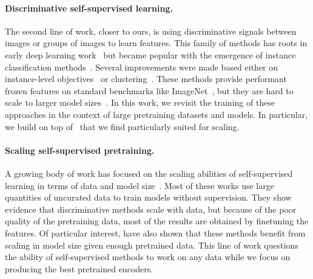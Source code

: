 \paragraph{Discriminative self-supervised learning.}
The second line of work, closer to ours, is using discriminative signals between images or groups of images to learn features.
This family of methods has roots in early deep learning work~\citep{hadsell2006dimensionality} but became popular with the emergence of instance classification methods~\citep{dosovitskiy2016discriminative, bojanowski2017unsupervised, wu2018unsupervised}.
Several improvements were made based either on instance-level objectives~\citep{henaff2019data,he2020momentum, chen2020exploring, chen2020simple,grill2020bootstrap, caron2021emerging} or clustering~\citep{caron2018deep,asano2019self, caron2020unsupervised}. 
These methods provide performant frozen features on standard benchmarks like ImageNet~\citep{russakovsky2015imagenet}, but they are hard to scale to larger model sizes~\citep{chen2021empirical}.
In this work, we revisit the training of these approaches in the context of large pretraining datasets and models.
In particular, we build on top of~\cite{zhou2021ibot} that we find particularly suited for scaling.

\paragraph{Scaling self-supervised pretraining.}
A growing body of work has focused on the scaling abilities of self-supervised learning in terms of data and model size~\citep{caron2019unsupervised, goyal2019scaling, tian2021divide, goyal2022vision}.
Most of these works use large quantities of uncurated data to train models without supervision.
They show evidence that discriminative methods scale with data, but because of the poor quality of the pretraining data, most of the results are obtained by finetuning the features.
Of particular interest, \cite{goyal2021self} have also shown that these methods benefit from scaling in model size given enough pretrained data.
This line of work questions the ability of self-supervised methods to work on any data while we focus on producing the best pretrained encoders.

